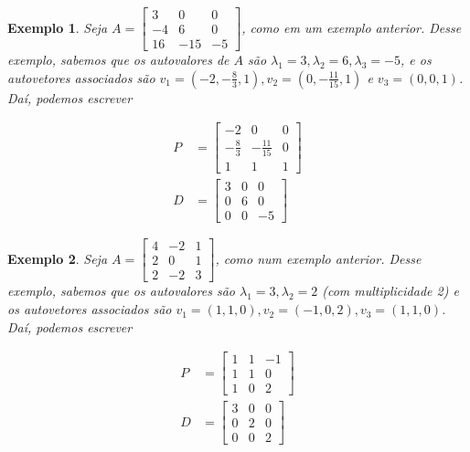 \documentclass{article}
\newtheorem*{example}{Exemplo}
\begin{document}
\begin{example}
	Seja $A = \begin{bmatrix}
	3 & 0 & 0 \\
	-4 & 6 & 0 \\
	16 & -15 & -5
	\end{bmatrix}$, como em um exemplo anterior. Desse exemplo, sabemos que os autovalores de $A$ são $\lambda_1 = 3, \lambda_2 = 6, \lambda_3 = -5$, e os autovetores associados são $v_1 = \left( -2, -\displaystyle{\frac{8}{3}}, 1 \right), v_2 = \left( 0, -\displaystyle{  \frac{11}{15} }, 1  \right)$ e $v_3 = (0,0,1)$. Daí, podemos escrever
	
	\begin{align*}
	P &= \begin{bmatrix}
	-2 & 0 & 0 \\
	-\displaystyle{\frac{8}{3}} & -\displaystyle{\frac{11}{15}} & 0 \\
	1 & 1 & 1
	\end{bmatrix} \\
	D &= \begin{bmatrix}
	3 & 0 & 0 \\
	0 & 6 & 0 \\
	0 & 0 & -5
	\end{bmatrix} 
	\end{align*}
	
	
\end{example}

\begin{example}
	Seja $A = \begin{bmatrix}
	4 & -2 & 1 \\
	2 & 0 & 1 \\
	2 & -2 & 3
	\end{bmatrix}$, como num exemplo anterior. Desse exemplo, sabemos que os autovalores são $\lambda_1 = 3, \lambda_2 = 2$ (com multiplicidade 2) e os autovetores associados são $v_1 = (1, 1, 0), v_2 = (-1, 0, 2), v_3 = (1, 1, 0)$. Daí, podemos escrever
	
	\begin{align*}
	P &= \begin{bmatrix}
	1 & 1 & -1 \\
	1 & 1 & 0 \\
	1 & 0 & 2 
	\end{bmatrix}\\
	D &= \begin{bmatrix}
	3 & 0 & 0 \\
	0 & 2 & 0 \\
	0 & 0 & 2
	\end{bmatrix}
	\end{align*}
	
\end{example}
\end{document}
